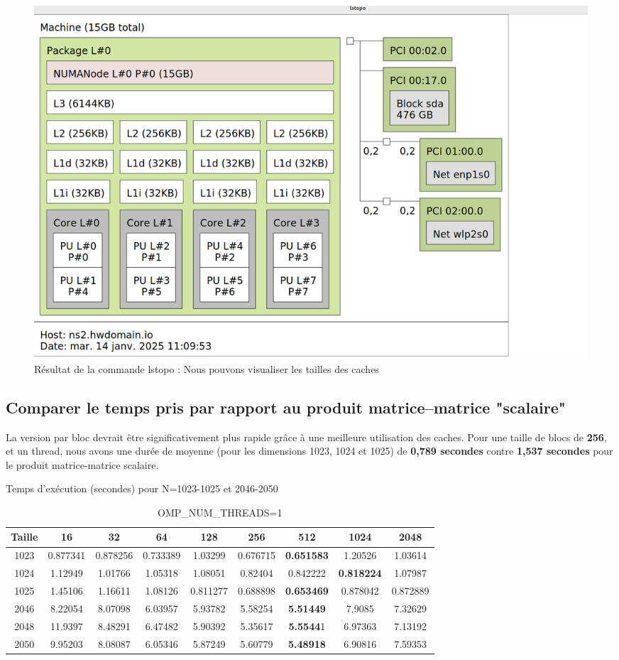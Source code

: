 \documentclass[a4paper,13pt]{book}
\begin{document}
\begin{figure}[!h]
    \begin{center}
        \includegraphics[scale=0.3]{images/lstopo.png}
        \caption{Résultat de la commande lstopo : Nous pouvons visualiser les tailles des caches}
        \label{tab:ls_topo}
    \end{center}
\end{figure}
\clearpage
\subsection{Comparer le temps pris par rapport au produit matrice–matrice "scalaire"}
    La version par bloc devrait être significativement plus rapide grâce à une meilleure utilisation des caches. Pour une taille de blocs de \textbf{256}, et un thread, nous avons une durée de moyenne (pour les dimensions 1023, 1024 et 1025) de \textbf{0,789 secondes}  contre \textbf{1,537 secondes} pour le produit matrice-matrice scalaire.

    \begin{table}
        \centering
        \caption{Temps d'exécution (secondes) pour N=1023-1025 et 2046-2050}
        \label{tab:small}
        \begin{tabular}{|c|c|c|c|c|c|c|c|c|}\hline
        Taille & 16 & 32 & 64 & 128 & 256  & 512 & 1024 & 2048\\\hline
        1023 & 0.877341 & 0.878256 & 0.733389 & 1.03299 & 0.676715 & \textbf{0.651583} & 1.20526 & 1.03614 \\\hline
        1024 & 1.12949 & 1.01766 & 1.05318 & 1.08051 & 0.82404 &  0.842222 & \textbf{0.818224} & 1.07987\\\hline
        1025 & 1.45106 & 1.16611 & 1.08126 & 0.811277 & 0.688898 & \textbf{0.653469} & 0.878042 & 0.872889\\\hline
        2046  & 8.22054 & 8.07098 & 6.03957 & 5.93782 & 5.58254 & \textbf{5.51449} & 7.9085 & 7.32629 \\\hline
        2048 &  11.9397 & 8.48291 & 6.47482 & 5.90392 & 5.35617 & \textbf{5.5544}1 & 6.97363 & 7.13192 \\\hline
        2050 &  9.95203 & 8.08087 & 6.05346 & 5.87249 & 5.60779 & \textbf{5.48918} & 6.90816 & 7.59353\\\hline
        \end{tabular}
        \caption{OMP\_NUM\_THREADS=1}
        \end{table}
\end{document}
